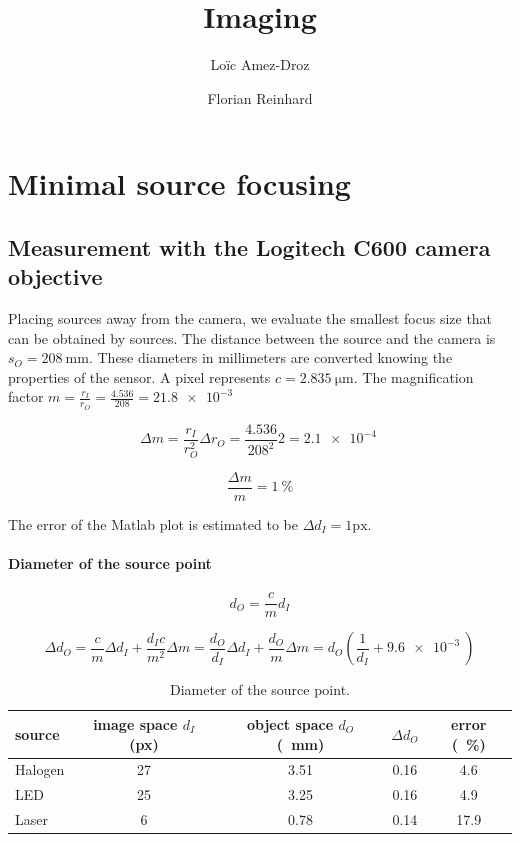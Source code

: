 \documentclass[a4paper, 12pt]{paper}
\author{Loïc Amez-Droz \and Florian Reinhard}
\title{Imaging}
\begin{document}

\section{Minimal source focusing}
\subsection{Measurement with the Logitech C600 camera objective}
Placing sources away from the camera, we evaluate the smallest focus size that can be obtained by sources.
The distance between the source and the camera is $s_O = \SI{208}{\milli\meter}$.
These diameters in millimeters are converted knowing the properties of the sensor.
A pixel represents $c = \SI{2.835}{\micro\meter}$.
The magnification factor $m = \frac{r_I}{r_O} = \frac{4.536}{208} = \SI{21.8e-3}{}$

\begin{equation}
    \Delta m = \frac{r_I}{r_O^2} \Delta r_O = \frac{4.536}{208^2}2 = \SI{2.1e-4}{}
\label{equ:m_err}
\end{equation}

\begin{equation}
    \frac{\Delta m}{m} = \SI{1}{\percent}
\label{equ:m_err_percent}
\end{equation}

The error of the Matlab plot is estimated to be $\Delta d_I = 1\mbox{px}$.

\paragraph{Diameter of the source point}

\begin{equation}
    d_O = \frac{c}{m} d_I
    \label{equ:object_diam}
\end{equation}

\begin{equation}
    \Delta d_O = \frac{c}{m} \Delta d_I + \frac{d_I c}{m^2} \Delta m
    = \frac{d_O}{d_I} \Delta d_I + \frac{d_O}{m} \Delta m
    = d_O \left( \frac{1}{d_I} + \SI{9.6e-3}{} \right)
    \label{equ:object_diam_err}
\end{equation}

\begin{table}[h]
    \centering
    \begin{tabular}{l S[table-format=1.0] S[table-format=1.2] S[table-format=1.2] S[table-format=2.1]}
        \toprule
        source & {image space $d_I$ (px)} & {object space $d_O$ (\SI{}{\milli\meter})} & {$\Delta d_O$} & {error (\SI{}{\percent})} \\
        \midrule
        Halogen & 27 & 3.51 & 0.16 &  4.6 \\
        LED     & 25 & 3.25 & 0.16 &  4.9 \\
        Laser   &  6 & 0.78 & 0.14 & 17.9 \\
        \bottomrule
    \end{tabular}
    \caption{Diameter of the source point.}
\label{tab:diams}
\end{table}
\end{document}
